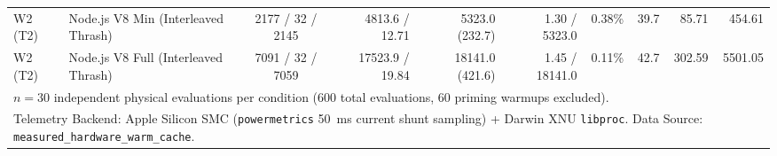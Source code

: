 \begin{table}[t]
\begin{tabular}{l l c r r r r r r r}
W2 (T2) & Node.js V8 Min (Interleaved Thrash) & 2177 / 32 / 2145 & 4813.6 / 12.71 & 5323.0 (232.7) & 1.30 / 5323.0 & 0.38\% & 39.7 & 85.71 & 454.61 \\
W2 (T2) & Node.js V8 Full (Interleaved Thrash) & 7091 / 32 / 7059 & 17523.9 / 19.84 & 18141.0 (421.6) & 1.45 / 18141.0 & 0.11\% & 42.7 & 302.59 & 5501.05 \\
\hline
\multicolumn{10}{l}{\footnotesize $n = 30$ independent physical evaluations per condition (600 total evaluations, 60 priming warmups excluded).} \\
\multicolumn{10}{l}{\footnotesize Telemetry Backend: Apple Silicon SMC (\texttt{powermetrics} 50~ms current shunt sampling) + Darwin XNU \texttt{libproc}. Data Source: \texttt{measured\_hardware\_warm\_cache}.} \\
\hline
\end{tabular}
\end{table}
